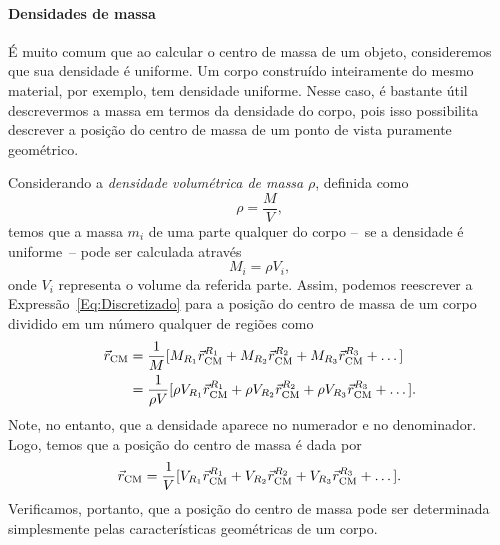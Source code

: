 \paragraph{Densidades de massa}

É muito comum que ao calcular o centro de massa de um objeto, consideremos que sua densidade é uniforme. Um corpo construído inteiramente do mesmo material, por exemplo, tem densidade uniforme. Nesse caso, é bastante útil descrevermos a massa em termos da densidade do corpo, pois isso possibilita descrever a posição do centro de massa de um ponto de vista puramente geométrico.

Considerando a \emph{densidade volumétrica de massa} $\rho$, definida como
\begin{equation}
    \rho = \frac{M}{V},
\end{equation}
%
temos que a massa $m_i$ de uma parte qualquer do corpo --~se a densidade é uniforme~-- pode ser calculada através
\begin{equation}
    M_i = \rho V_i,
\end{equation}
%
onde $V_i$ representa o volume da referida parte. Assim, podemos reescrever a Expressão~\eqref{Eq:Discretizado} para a posição do centro de massa de um corpo dividido em um número qualquer de regiões como
\begin{align}
    \vec{r}_{\rm{CM}} &= \frac{1}{M} [M_{R_1} \vec{r}_{\rm{CM}}^{R_1} + M_{R_2} \vec{r}_{\rm{CM}}^{R_2} + M_{R_3} \vec{r}_{\rm{CM}}^{R_3} + \dots] \\
    &= \frac{1}{\rho V} [\rho V_{R_1} \vec{r}_{\rm{CM}}^{R_1} + \rho V_{R_2} \vec{r}_{\rm{CM}}^{R_2} + \rho V_{R_3} \vec{r}_{\rm{CM}}^{R_3} + \dots].
\end{align}
%
Note, no entanto, que a densidade aparece no numerador e no denominador. Logo, temos que a posição do centro de massa é dada por
\begin{equation}\label{Eq:CMDensVolConst}
    \vec{r}_{\rm{CM}} = \frac{1}{V} [V_{R_1} \vec{r}_{\rm{CM}}^{R_1} + V_{R_2} \vec{r}_{\rm{CM}}^{R_2} + V_{R_3} \vec{r}_{\rm{CM}}^{R_3} + \dots].
\end{equation}
%
Verificamos, portanto, que a posição do centro de massa pode ser determinada simplesmente pelas características geométricas de um corpo.

